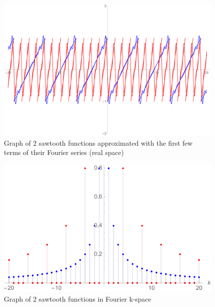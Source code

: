 \documentclass[a4paper,12pt]{article}
\begin{document}
\begin{figure}[H]
  \centering
  \includegraphics[width=140mm, scale=0.5]{images/sawtooth-comparison-real-space.pdf}
  \caption{Graph of 2 sawtooth functions approximated with the first few terms of their Fourier series (real space)}
  \label{Sawtooth-comparison}
\end{figure}


\begin{figure}[H]
  \centering
  \includegraphics[width=140mm, scale=0.5]{images/sawtooth-comparison-k-space.pdf}
  \caption{Graph of 2 sawtooth functions in Fourier k-space}
  \label{Sawtooth-comparison}
\end{figure}
\end{document}
